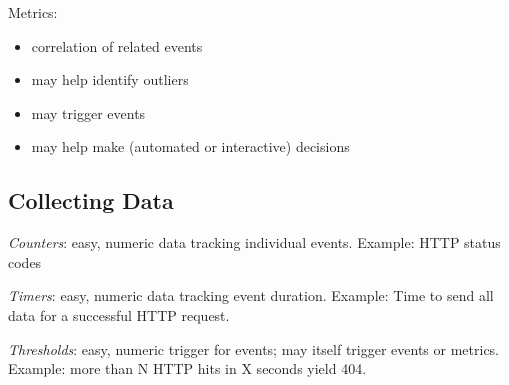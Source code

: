 \documentclass[xga]{xdvislides}
\begin{document}
Metrics:
\begin{itemize}
	\item correlation of related events
	\item may help identify outliers
	\item may trigger events
	\item may help make (automated or interactive) decisions
\end{itemize}


\subsection{Collecting Data}
{\em Counters}: easy, numeric data tracking individual events. Example: HTTP status codes

\addvspace{.5in}
{\em Timers}: easy, numeric data tracking event duration. Example: Time to send all
data for a successful HTTP request.

\addvspace{.5in}
{\em Thresholds}: easy, numeric trigger for events; may itself trigger events or metrics.
Example: more than N HTTP hits in X seconds yield 404.
\end{document}
